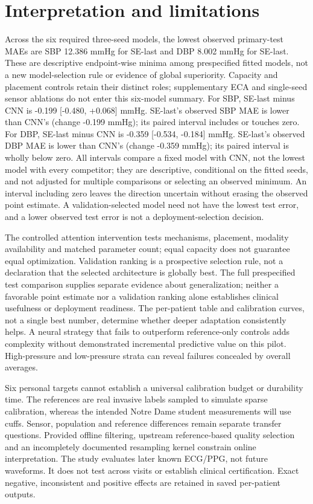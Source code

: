 \documentclass[11pt]{article}
\begin{document}
\section{Interpretation and limitations}
Across the six required three-seed models, the lowest observed primary-test MAEs are SBP 12.386 mmHg for SE-last and DBP 8.002 mmHg for SE-last. These are descriptive endpoint-wise minima among prespecified fitted models, not a new model-selection rule or evidence of global superiority. Capacity and placement controls retain their distinct roles; supplementary ECA and single-seed sensor ablations do not enter this six-model summary. For SBP, SE-last minus CNN is -0.199 [-0.480, +0.068] mmHg. SE-last's observed SBP MAE is lower than CNN's (change -0.199 mmHg); its paired interval includes or touches zero. For DBP, SE-last minus CNN is -0.359 [-0.534, -0.184] mmHg. SE-last's observed DBP MAE is lower than CNN's (change -0.359 mmHg); its paired interval is wholly below zero. All intervals compare a fixed model with CNN, not the lowest model with every competitor; they are descriptive, conditional on the fitted seeds, and not adjusted for multiple comparisons or selecting an observed minimum. An interval including zero leaves the direction uncertain without erasing the observed point estimate. A validation-selected model need not have the lowest test error, and a lower observed test error is not a deployment-selection decision.

The controlled attention intervention tests mechanisms, placement, modality
availability and matched parameter count; equal capacity does not guarantee
equal optimization. Validation ranking is a prospective selection rule, not
a declaration that the selected architecture is globally best. The full
prespecified test comparison supplies separate evidence about generalization;
neither a favorable point estimate nor a validation ranking alone establishes
clinical usefulness or deployment readiness.
The per-patient table and calibration curves, not a single best number,
determine whether deeper adaptation consistently helps. A neural strategy
that fails to outperform reference-only controls adds complexity without
demonstrated incremental predictive value on this pilot. High-pressure and
low-pressure strata can reveal failures concealed by overall averages.

Six personal targets cannot establish a universal calibration budget or
durability time. The references are real invasive labels sampled to simulate
sparse calibration, whereas the intended Notre Dame student measurements will use cuffs. Sensor,
population and reference differences remain separate transfer questions.
Provided offline filtering, upstream reference-based quality selection and
an incompletely documented resampling kernel constrain online interpretation.
The study evaluates later known ECG/PPG, not future waveforms. It does not
test across visits or establish clinical certification. Exact negative,
inconsistent and positive effects are retained in saved per-patient outputs.
\end{document}
